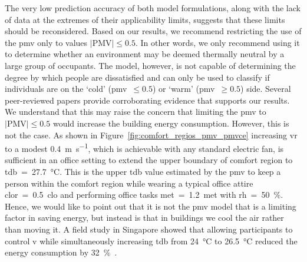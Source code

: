 The very low prediction accuracy of both model formulations, along with the lack of data at the extremes of their applicability limits, suggests that these limits should be reconsidered.
Based on our results, we recommend restricting the use of the \ac{pmv} only to values $\lvert \textrm{PMV}\lvert \leq 0.5$.
In other words, we only recommend using it to determine whether an environment may be deemed thermally neutral by a large group of occupants.
The model, however, is not capable of determining the degree by which people are dissatisfied and can only be used to classify if individuals are on the `cold' (\ac{pmv}~$\leq 0.5$) or `warm' (\ac{pmv}~$\geq 0.5$) side.
Several peer-reviewed papers \cite{Cheung2019, Yao2022, kim2019thermal, tartarini2018thermal, Humphreys2002, doherty_evaluation_1988} provide corroborating evidence that supports our results.
We understand that this may raise the concern that limiting the \ac{pmv} to $\lvert \textrm{PMV}\lvert \leq 0.5$ would increase the building energy consumption.
However, this is not the case.
As shown in Figure~\ref{fig:comfort_regios_pmv_pmvce} increasing \ac{vr} to a modest \qty{0.4}{\m\per\s}, which is achievable with any standard electric fan, is sufficient in an office setting to extend the upper boundary of comfort region to \ac{tdb}~=~\qty{27.7}{\celsius}.
This is the upper \ac{tdb} value estimated by the \ac{pmv} to keep a person within the comfort region while wearing a typical office attire \ac{clor}~=~\qty{0.5}{clo} and performing office tasks \ac{met}~=~\qty{1.2}{met} with \ac{rh}~=~\qty{50}{\percent}.
Hence, we would like to point out that it is not the \ac{pmv} model that is a limiting factor in saving energy, but instead is that in buildings we cool the air rather than moving it.
A field study in Singapore showed that allowing participants to control \ac{v} while simultaneously increasing \ac{tdb} from \qty{24}{\celsius} to \qty{26.5}{\celsius} reduced the energy consumption by \qty{32}{\percent}~\cite{kent_energy_2023}.

